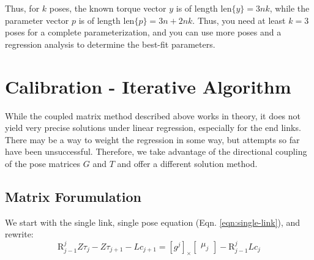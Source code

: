 \documentclass[letterpaper,12pt]{article}
\newcommand{\R}[2]{{\mbox{R}}^{#1}_{#2}}
\newcommand{\onevec}[1]
   {\left[ \begin{array}{c} #1 \end{array} \right] }
\begin{document}
      Thus, for $k$ poses, the known torque vector
      $y$ is of length $\mbox{len}\{y\}=3nk$,
      while the parameter vector
      $p$ is of length $\mbox{len}\{p\}=3n+2nk$.
      Thus, you need at least $k=3$ poses for a complete parameterization,
      and you can use more poses and a regression analysis to determine
      the best-fit parameters.

\section{Calibration - Iterative Algorithm}

   While the coupled matrix method described above works in theory,
   it does not yield very precise solutions under linear regression,
   especially for the end links.  There may be a way to weight the regression
   in some way, but attempts so far have been unsuccessful.  Therefore,
   we take advantage of the directional coupling of the pose matrices
   $G$ and $T$ and offer a different solution method.
   
   \subsection{Matrix Forumulation}
   
      We start with the single link, single pose equation
      (Eqn. \ref{eqn:single-link}), and rewrite:
      \begin{equation}
         \R{j}{j-1} Z \tau_j - Z \tau_{j+1}
         - L c_{j+1}
         = \left[ g^j \right]_{\times} \onevec{\mu_j}
         - \R{j}{j-1} L c_j
      \end{equation}
      
\end{document}
